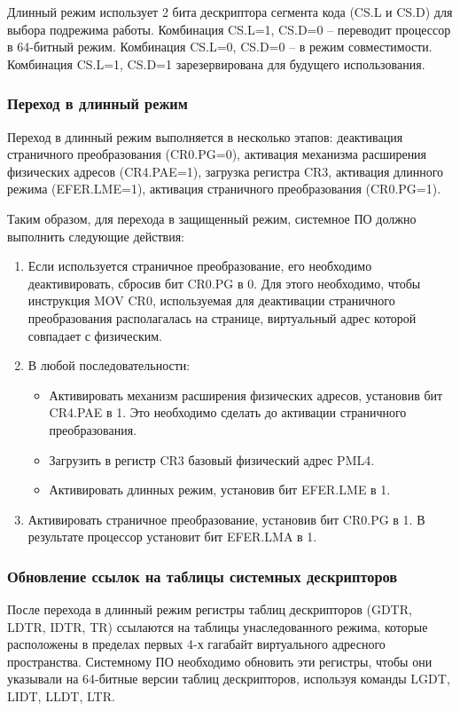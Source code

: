 Длинный режим использует 2 бита дескриптора сегмента кода (CS.L и CS.D) для выбора подрежима работы.
Комбинация CS.L=1, CS.D=0 -- переводит процессор в 64-битный режим. Комбинация CS.L=0, CS.D=0 -- в
режим совместимости. Комбинация CS.L=1, CS.D=1 зарезервирована для будущего использования.

\subsubsection*{Переход в длинный режим}
Переход в длинный режим выполняется в несколько этапов: деактивация страничного преобразования (CR0.PG=0),
активация механизма расширения физических адресов (CR4.PAE=1), загрузка регистра CR3,
активация длинного режима (EFER.LME=1), активация страничного преобразования (CR0.PG=1).

Таким образом, для перехода в защищенный режим, системное ПО должно выполнить следующие действия:
\begin{enumerate}[1.]
\item Если используется страничное преобразование, его необходимо деактивировать, сбросив бит CR0.PG в 0.
	Для этого необходимо, чтобы инструкция MOV CR0, используемая для деактивации страничного преобразования
	располагалась на странице, виртуальный адрес которой совпадает с физическим.
\item В любой последовательности:
	\begin{itemize}
	\item Активировать механизм расширения физических адресов, установив бит CR4.PAE в 1. Это
		необходимо сделать до активации страничного преобразования.
	\item Загрузить в регистр CR3 базовый физический адрес PML4.
	\item Активировать длинных режим, установив бит EFER.LME в 1.
	\end{itemize}
\item Активировать страничное преобразование, установив бит CR0.PG в 1. В результате процессор установит бит EFER.LMA в 1.
\end{enumerate}

\subsubsection*{Обновление ссылок на таблицы системных дескрипторов}
После перехода в длинный режим регистры таблиц дескрипторов (GDTR, LDTR, IDTR, TR) ссылаются на таблицы унаследованного
режима, которые расположены в пределах первых 4-х гагабайт виртуального адресного пространства. Системному ПО необходимо
обновить эти регистры, чтобы они указывали на 64-битные версии таблиц дескрипторов, используя команды LGDT, LIDT, LLDT, LTR.

